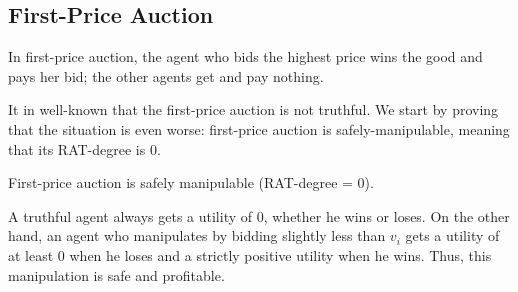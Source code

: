 \subsection{First-Price Auction}
In first-price auction, the agent who bids the highest price wins the good and pays her bid; the other agents get and pay nothing. 

It in well-known that the first-price auction is not truthful.
We start by proving that the situation is even worse: first-price auction is safely-manipulable, meaning that its RAT-degree is $0$.

\begin{theoremrep}
First-price auction is safely manipulable (RAT-degree = $0$).
\end{theoremrep}
\begin{proofsketch}
    A truthful agent always gets a utility of $0$,  whether he wins or loses.
    On the other hand, an agent who manipulates by bidding slightly less than $v_i$ gets a utility of at least $0$ when he loses and a strictly positive utility when he wins. 
    Thus, this manipulation is safe and profitable.
\end{proofsketch}
